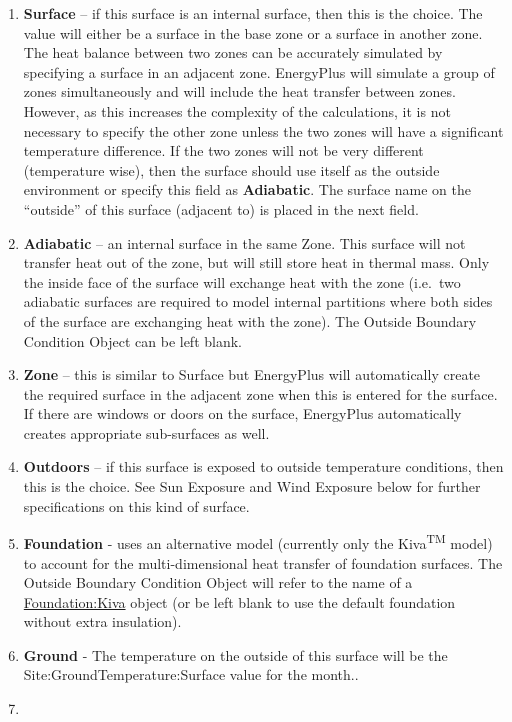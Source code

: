 \begin{enumerate}
  \item
    \textbf{Surface} -- if this surface is an internal surface, then this is the choice. The value will either be a surface in the base zone or a surface in another zone. The heat balance between two zones can be accurately simulated by specifying a surface in an adjacent zone. EnergyPlus will simulate a group of zones simultaneously and will include the heat transfer between zones. However, as this increases the complexity of the calculations, it is not necessary to specify the other zone unless the two zones will have a significant temperature difference. If the two zones will not be very different (temperature wise), then the surface should use itself as the outside environment or specify this field as \textbf{Adiabatic}. The surface name on the ``outside'' of this surface (adjacent to) is placed in the next field.
  \item
    \textbf{Adiabatic} -- an internal surface in the same Zone. This surface will not transfer heat out of the zone, but will still store heat in thermal mass. Only the inside face of the surface will exchange heat with the zone (i.e.~two adiabatic surfaces are required to model internal partitions where both sides of the surface are exchanging heat with the zone). The Outside Boundary Condition Object can be left blank.
  \item
    \textbf{Zone} -- this is similar to Surface but EnergyPlus will automatically create the required surface in the adjacent zone when this is entered for the surface. If there are windows or doors on the surface, EnergyPlus automatically creates appropriate sub-surfaces as well.
  \item
    \textbf{Outdoors} -- if this surface is exposed to outside temperature conditions, then this is the choice. See Sun Exposure and Wind Exposure below for further specifications on this kind of surface.
  \item
    \textbf{Foundation} - uses an alternative model (currently only the Kiva\textsuperscript{TM} model) to account for the multi-dimensional heat transfer of foundation surfaces. The Outside Boundary Condition Object will refer to the name of a \hyperref[foundationkiva]{Foundation:Kiva} object (or be left blank to use the default foundation without extra insulation).
  \item
    \textbf{Ground} - The temperature on the outside of this surface will be the Site:GroundTemperature:Surface value for the month..
  \item

\end{enumerate}
